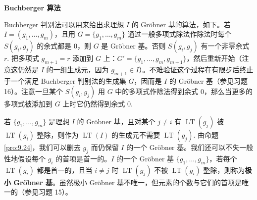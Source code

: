 \noindent\textbf{Buchberger 算法}

Buchberger 判别法可以用来给出求理想 \(I\) 的 Gröbner 基的算法，如下。若 \(I = (g_1, \ldots, g_m)\)，且用 \(G = \{g_1, \ldots, g_m\}\) 通过一般多项式除法作除法时每个 \(S(g_i, g_j)\) 的余式都是 0，则 \(G\) 是 Gröbner 基。否则 \(S(g_i, g_j)\) 有一个非零余式 \(r\). 把多项式 \(g_{m+1} = r\) 添加到 \(G\) 上：\(G' = \{g_1, \ldots, g_m, g_{m+1}\}\)，然后重新开始（注意这仍然是 \(I\) 的一组生成元，因为 \(g_{m+1} \in I\)）。不难验证这个过程在有限步后终止于一个满足 Buchberger 判别法的生成集 \(G\)，因而是 \(I\) 的 Gröbner 基（参见习题 16）。注意一旦某个 \(S(g_i, g_j)\) 用 \(G\) 中的多项式作除法得到余式 0，那么当更多的多项式被添加到 \(G\) 上时它仍然得到余式 0.

若 \(\{g_1, \ldots, g_m\}\) 是理想 \(I\) 的 Gröbner 基，且对某个 \(j \neq i\) 有 \(\operatorname{LT}(g_j)\) 被 \(\operatorname{LT}(g_i)\) 整除，则作为 \(\operatorname{LT}(I)\) 的生成元不需要 \(\operatorname{LT}(g_j)\). 由命题 \ref{pro:9.24}，我们可以删去 \(g_j\) 而仍保留 \(I\) 的一个 Gröbner 基。我们还可以不失一般性地假设每个 \(g_i\) 的首项是首一的。\(I\) 的一个 Gröbner 基 \(\{g_1, \ldots, g_m\}\)，若每个 \(\operatorname{LT}(g_i)\) 都是首一的，且当 \(i \neq j\) 时 \(\operatorname{LT}(g_j)\) 不被 \(\operatorname{LT}(g_i)\) 整除，则称为\textbf{极小 Gröbner 基}。虽然极小 Gröbner 基不唯一，但元素的个数与它们的首项是唯一的（参见习题 15）。

